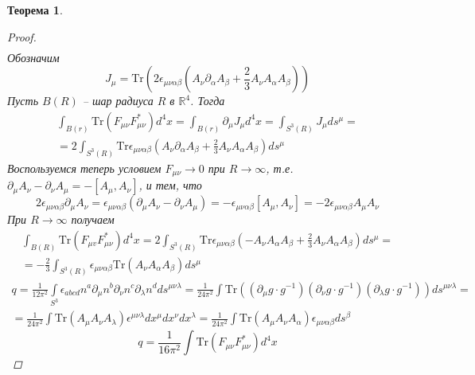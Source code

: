 \documentclass[12pt]{article}
\newtheorem{theorem}{Теорема}[section]
\theoremstyle{definition}
\begin{document}
\begin{theorem}
\begin{proof}
\begin{multline}
        \end{multline}
        Обозначим
        \begin{equation}
            J_\mu=\text{Tr}\left(2 \epsilon_{\mu\nu\alpha\beta}\left(A_\nu\partial_\alpha A_\beta+\frac{2}{3}A_\nu A_\alpha A_\beta\right)\right)
        \end{equation}
        Пусть $B(R)$ -- шар радиуса $R$ в $\mathbb{R}^4$. Тогда
        \begin{multline}\label{eq23}
            \int_{B(r)}\text{Tr}\left(F_{\mu\nu}F_{\mu\nu}^*\right)d^4x=\int_{B(r)}\partial_\mu J_\mu d^4x=\int_{S^3(R)}J_\mu ds^\mu=\\=2\int_{S^3(R)}\text{Tr} \epsilon_{\mu\nu\alpha\beta}\left(A_\nu \partial_\alpha A_\beta+\frac{2}{3}A_\nu A_\alpha A_\beta\right)ds^\mu
        \end{multline}
        Воспользуемся теперь условием $F_{\mu\nu} \rightarrow 0$ при $R\rightarrow\infty$, т.е. $\partial_\mu A_\nu-\partial_\nu A_\mu=-[A_\mu, A_\nu]$, и тем, что
        \begin{equation}
            2\epsilon_{\mu\nu\alpha\beta}\partial_\mu A_\nu=\epsilon_{\mu\nu\alpha\beta}\left(\partial_\mu A_\nu-\partial_\nu A_\mu\right)=-\epsilon_{\mu\nu\alpha\beta}\left[A_\mu, A_\nu\right]=-2\epsilon_{\mu\nu\alpha\beta} A_\mu A_\nu
        \end{equation}
        При $R\rightarrow\infty$ получаем
        \begin{multline}
            \int_{B(R)}\text{Tr}(F_{\mu v} F_{\mu \nu}^*)d^4x=2\int_{S^3(R)}\text{Tr} \epsilon_{\mu\nu\alpha\beta}\left(-A_\nu A_\alpha A_\beta+\frac{2}{3} A_\nu A_\alpha A_\beta\right)ds^\mu=\\=-\frac{2}{3}\int_{S^3(R)}\epsilon_{\mu\nu\alpha \beta}\text{Tr}\left(A_\nu A_\alpha A_\beta\right)ds^\mu
        \end{multline}
        \begin{multline}
            q=\frac{1}{12\pi^2}\int\limits_{S^3}\epsilon_{abcd}n^a\partial_\mu n^b\partial_\nu n^c\partial_\lambda n^dds^{\mu\nu\lambda}=\frac{1}{24\pi^2}\int\text{Tr}((\partial_\mu g\cdot g^{-1})(\partial_\nu g\cdot g^{-1})(\partial_\lambda g\cdot g^{-1}))ds^{\mu\nu\lambda}=\\=\frac{1}{24\pi^2}\int\text{Tr}(A_\mu A_\nu A_\lambda)\epsilon^{\mu\nu\lambda}dx^\mu dx^\nu dx^\lambda=\frac{1}{24\pi^2}\int\text{Tr}(A_\mu A_\nu A_\alpha)\epsilon_{\mu\nu\alpha\beta}ds^\beta
        \end{multline}
        \begin{equation}
            q=\frac{1}{16\pi^2}\int\text{Tr}(F_{\mu\nu}F^*_{\mu\nu})d^4x
        \end{equation}
    \end{proof}
\end{theorem}
\end{document}
